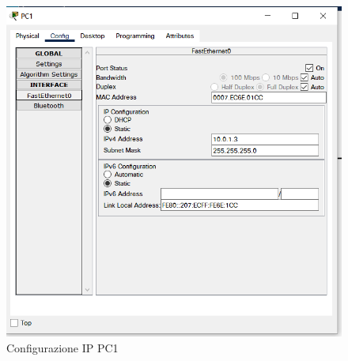 \documentclass[a4paper,12pt]{report}
\begin{document}
\begin{figure}
\includegraphics[]{pc1_ip_config.png}
\caption{Configurazione IP PC1}
\label{fig:pc1_ip_config}
\end{figure}
\end{document}
